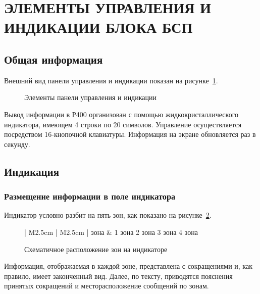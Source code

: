 \section{ЭЛЕМЕНТЫ УПРАВЛЕНИЯ И ИНДИКАЦИИ БЛОКА БСП} \label{sec:overview}


\subsection{Общая информация} 

Внешний вид панели управления и индикации показан на рисунке~\ref{fig:pi}.

\begin{figure}[H]
	
	\caption{Элементы панели управления и индикации}
	\label{fig:pi}
\end{figure}

Вывод информации в Р400 организован с помощью жидкокристаллического индикатора, имеющем 4 строки по 20 символов. Управление осуществляется посредством 16-кнопочной клавиатуры. Информация на экране обновляется раз в секунду.


\subsection{Индикация} 


\subsubsection{Размещение информации в поле индикатора}

Индикатор условно разбит на пять зон, как показано на рисунке~\ref{fig:overview_ind}.

\begin{figure}[H]
	\centering
	
	\begin{tabular}{| M{2.5cm} | M{2.5cm} |}	
		 зона	& 1 зона 				\tabularnewline \hline 
	     {2 зона}	\tabularnewline \hline
	     {3 зона}	\tabularnewline \hline
	     {4 зона}	\tabularnewline 
	    \lasthline 
	\end{tabular} 
	
	\caption{Схематичное расположение зон на индикаторе} 
	\label{fig:overview_ind}
\end{figure}

Информация, отображаемая в каждой зоне, представлена с сокращениями и, как правило, имеет законченный вид. Далее, по тексту, приводятся пояснения принятых сокращений и месторасположение сообщений по зонам.

